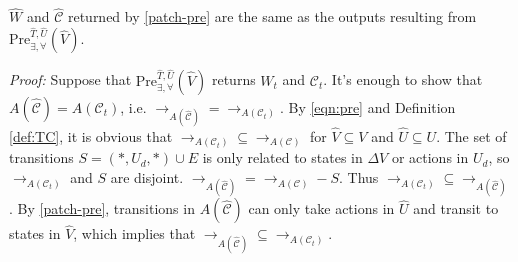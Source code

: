 \begin{theorem}
	$ \widehat{W} $ and $ \widehat{\mathcal{C}} $ returned by \eqref{patch-pre} are the same as the outputs resulting from $ \text{Pre}_{\exists,\forall}^{\widehat{T},\widehat{U}}(\widehat{V})$.	\label{thm:pre}
\end{theorem}

\emph{Proof:} Suppose that $ \text{Pre}_{\exists,\forall}^{\widehat{T},\widehat{U}}(\widehat{V}) $ returns $ W_t $ and $ \mathcal{C}_t $. It's enough to show that $ A(\widehat{\mathcal{C}})= A(\mathcal{C}_t)$, i.e. $ \rightarrow_{A(\widehat{\mathcal{C}})} = \rightarrow_{A(\mathcal{C}_t)} $. By \eqref{eqn:pre} and Definition \ref{def:TC}, it is obvious that $ \rightarrow_{A(\mathcal{C}_t)} \subseteq \rightarrow_{A(\mathcal{C})}$ for $ \widehat{V}\subseteq V $ and $ \widehat{U}\subseteq U $. The set of transitions $ S = (*,U_d,*)\cup E $ is only related to states in $ \Delta V $ or actions in $ U_d $, so $\rightarrow_{A(\mathcal{C}_t)}$ and $ S $ are disjoint. $ \rightarrow_{A(\widehat{\mathcal{C}})}= \rightarrow_{A(\mathcal{C})}-S$. Thus $ \rightarrow_{A(\mathcal{C}_t)}\subseteq \rightarrow_{A(\widehat{\mathcal{C}})}$. By \eqref{patch-pre}, transitions in $ A(\widehat{\mathcal{C}}) $ can only take actions in $ \widehat{U} $ and transit to states in $ \widehat{V} $, which implies that $ \rightarrow_{A(\widehat{\mathcal{C}})}\subseteq \rightarrow_{A(\mathcal{C}_t)} $. \QEDB 


